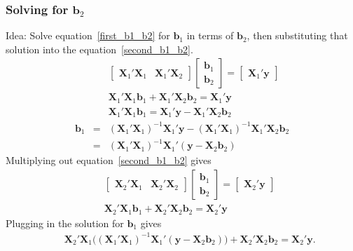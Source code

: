 \documentclass[a4paper,12pt]{article}
\begin{document}
\subsubsection*{Solving for $\bm{b}_2$}

Idea: Solve equation~\eqref{first_b1_b2} for $\bm{b}_1$ in terms of $\bm{b}_2$, then substituting that solution into the equation~\eqref{second_b1_b2}.
\begin{eqnarray}
&&\begin{bmatrix}
\bm{X}_1'\bm{X}_1 & \bm{X}_1'\bm{X}_2
\end{bmatrix}
\begin{bmatrix}
\bm{b}_1\\
\bm{b}_2
\end{bmatrix}=\begin{bmatrix}
\bm{X}_1'\bm{y}
\end{bmatrix}\nonumber\\
&&\bm{X}_1'\bm{X}_1\bm{b}_1+\bm{X}_1'\bm{X}_2\bm{b}_2=\bm{X}_1'\bm{y}\nonumber\\
&&\bm{X}_1'\bm{X}_1\bm{b}_1=\bm{X}_1'\bm{y}-\bm{X}_1'\bm{X}_2\bm{b}_2\nonumber\\
\bm{b}_1&=&(\bm{X}_1'\bm{X}_1)^{-1}\bm{X}_1'\bm{y}-(\bm{X}_1'\bm{X}_1)^{-1}\bm{X}_1'\bm{X}_2\bm{b}_2\nonumber\\
&=&(\bm{X}_1'\bm{X}_1)^{-1}\bm{X}_1'(\bm{y}-\bm{X}_2\bm{b}_2)\nonumber
\end{eqnarray}
Multiplying out equation~\eqref{second_b1_b2} gives
\begin{eqnarray}
&&\begin{bmatrix}
\bm{X}_2'\bm{X}_1 & \bm{X}_2'\bm{X}_2
\end{bmatrix}
\begin{bmatrix}
\bm{b}_1\\
\bm{b}_2
\end{bmatrix}=\begin{bmatrix}
\bm{X}_2'\bm{y}
\end{bmatrix}\nonumber\\
&&\bm{X}_2'\bm{X}_1\bm{b}_1+\bm{X}_2'\bm{X}_2\bm{b}_2=\bm{X}_2'\bm{y}\nonumber
\end{eqnarray}
Plugging in the solution for $\bm{b}_1$ gives
\begin{eqnarray}
&&\bm{X}_2'\bm{X}_1\bigg((\bm{X}_1'\bm{X}_1)^{-1}\bm{X}_1'(\bm{y}-\bm{X}_2\bm{b}_2)\bigg)+\bm{X}_2'\bm{X}_2\bm{b}_2=\bm{X}_2'\bm{y}.\nonumber
\end{eqnarray}
\end{document}
